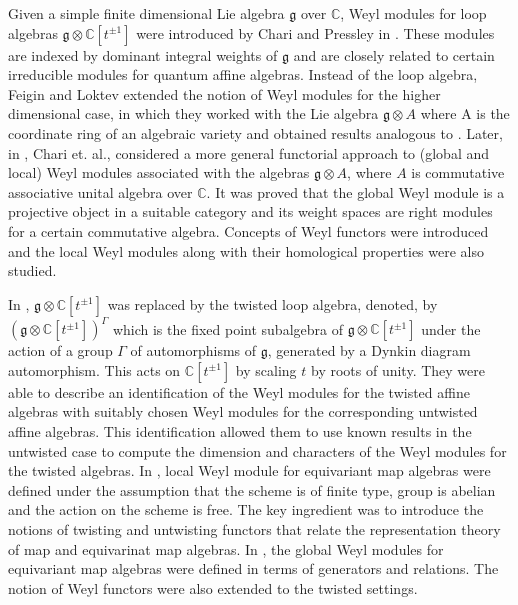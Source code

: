 \documentclass[11pt]{amsart}
\theoremstyle{plain}
\theoremstyle{definition}
\newcommand{\g}{\mathfrak{g}}
\begin{document}
 
 Given a simple finite dimensional Lie algebra $\g$ over $\mathbb{C}$, Weyl modules for loop algebras $\g\otimes \mathbb{C}[t^{\pm 1}]$ were introduced by Chari and Pressley in \cite{CP01}. These modules are indexed by dominant integral weights of $\g$ and are closely related to certain irreducible modules for quantum affine algebras. Instead of the loop algebra, Feigin and Loktev \cite{FL04} extended the notion of Weyl modules for the higher dimensional case, in which they worked with the Lie algebra $\g\otimes A$ where A is the coordinate ring of an algebraic variety and obtained results analogous to \cite{CP01}. Later, in \cite{CFK10}, Chari et. al., considered a more general functorial approach to (global and local) Weyl modules associated with the algebras $\g\otimes A$, where $A$ is commutative associative unital algebra over $\mathbb{C}$. It was proved that the global Weyl module is a projective object in a suitable category and its weight spaces are right modules for a certain commutative algebra. Concepts of Weyl functors were introduced and the local Weyl modules along with their homological properties were also studied.

In \cite{CFS08, FMS13}, $\g\otimes\mathbb{C}[t^{\pm 1}]$ was replaced by the twisted loop algebra, denoted, by $(\g\otimes\mathbb{C}[t^{\pm 1}])^{\Gamma}$ which is the fixed point subalgebra of $\g\otimes\mathbb{C}[t^{\pm1}]$ under the action of a group $\Gamma$ of automorphisms of $\g$, generated by a Dynkin diagram automorphism. This acts on $\mathbb{C}[t^{\pm1}]$ by scaling $t$ by roots of unity. They were able to describe an identification of the Weyl modules for the twisted affine algebras with suitably chosen Weyl modules for the corresponding untwisted affine algebras. This identification allowed them to use known results in the untwisted case to compute the dimension and characters of the Weyl modules for the twisted algebras. In \cite{FKKS12}, local Weyl module for equivariant map algebras were defined under the assumption that the scheme is of finite type, group is abelian and the action on the scheme is free. The key ingredient was to introduce the notions of twisting and untwisting functors that relate the representation theory of map and equivarinat map algebras. In \cite{FMS15}, the global Weyl modules for equivariant map algebras were defined in terms of generators and relations. The notion of Weyl functors were also extended to the twisted settings. 
\end{document}
